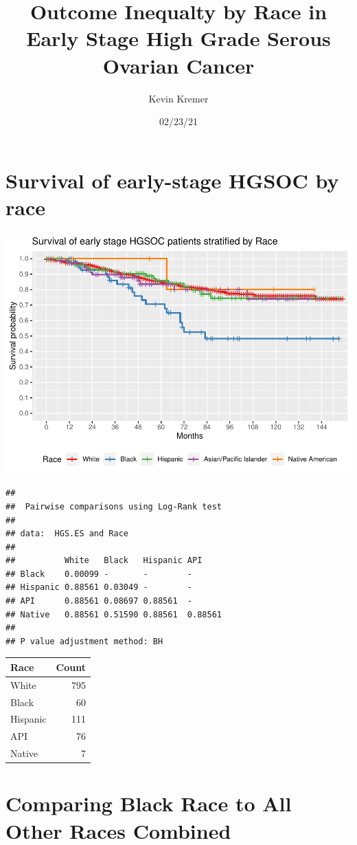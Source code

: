 \documentclass[
]{article}
\title{Outcome Inequalty by Race in Early Stage High Grade Serous Ovarian
Cancer}
\author{Kevin Kremer}
\date{02/23/21}
\begin{document}
\maketitle

\hypertarget{survival-of-early-stage-hgsoc-by-race}{%
\section{Survival of early-stage HGSOC by
race}\label{survival-of-early-stage-hgsoc-by-race}}

\includegraphics{EarlyOvaryRace_files/figure-latex/unnamed-chunk-1-1.pdf}

\begin{verbatim}
## 
##  Pairwise comparisons using Log-Rank test 
## 
## data:  HGS.ES and Race 
## 
##          White   Black   Hispanic API    
## Black    0.00099 -       -        -      
## Hispanic 0.88561 0.03049 -        -      
## API      0.88561 0.08697 0.88561  -      
## Native   0.88561 0.51590 0.88561  0.88561
## 
## P value adjustment method: BH
\end{verbatim}

\begin{tabular}[t]{l|r}
\hline
Race & Count\\
\hline
White & 795\\
\hline
Black & 60\\
\hline
Hispanic & 111\\
\hline
API & 76\\
\hline
Native & 7\\
\hline
\end{tabular}

\hypertarget{comparing-black-race-to-all-other-races-combined}{%
\section{Comparing Black Race to All Other Races
Combined}\label{comparing-black-race-to-all-other-races-combined}}
\end{document}
